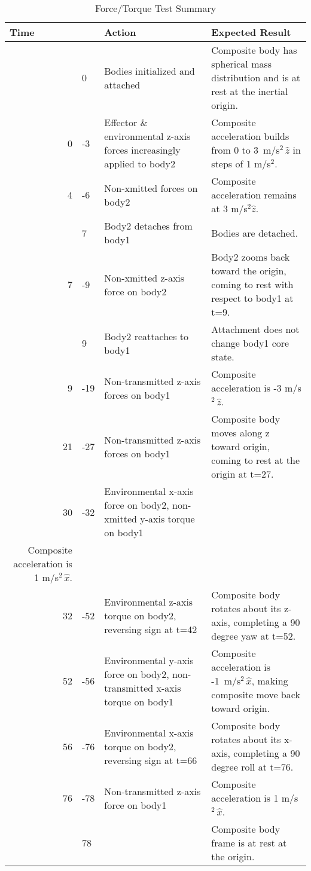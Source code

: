 \begin{table}[htp]
\centering
\caption{Force/Torque Test Summary}
\label{tab:force_torque_summary}
\vspace{1ex}
\begin{tabular}{||r@{}l|p{2.6in}|p{3in}|} \hline
\multicolumn{2}{||l|}{\bf Time} & {\bf Action} & {\bf Expected Result}
\\ \hline \hline
&0 &
  Bodies initialized and attached &
  \raggedright
  Composite body has spherical mass distribution and
  is at rest at the inertial origin.\tabularnewline[6pt]  
0&-3 &
  \raggedright
  Effector \& environmental z-axis forces increasingly applied to body2 &
  \raggedright
  Composite acceleration builds from 0 to 3~m/s$^2\,\hat z$
  in steps of 1 m/s$^2$.\tabularnewline[6pt]
4&-6 &
  Non-xmitted forces on body2 &
  Composite acceleration remains at 3 m/s$^2\hat z$.\tabularnewline[6pt]
&7 &
  Body2 detaches from body1 &
  Bodies are detached.\tabularnewline[6pt]
7&-9 &
  Non-xmitted z-axis force on body2 &
  \raggedright
  Body2 zooms back toward the origin,
  coming to rest with respect to body1 at t=9.\tabularnewline[6pt]
&9& Body2 reattaches to body1 &
  Attachment does not change body1 core state.\tabularnewline[6pt]
9&-19 &
  Non-transmitted z-axis forces on body1 &
  Composite acceleration is -3 m/s$^2\,\hat z$.\tabularnewline[6pt]
21&-27 &
  Non-transmitted z-axis forces on body1 &
  \raggedright
  Composite body moves along z toward origin,
  coming to rest at the origin at t=27.\tabularnewline[6pt]
30&-32 &
  Environmental x-axis force on body2,
  non-xmitted y-axis torque on body1 &
  \raggedright \ \\
  Composite acceleration is 1 m/s$^2\,\hat x$.\tabularnewline[6pt]
32&-52 &
  Environmental z-axis torque on body2, reversing sign at t=42 &
  \raggedright
  Composite body rotates about its z-axis,
   completing a 90 degree yaw at t=52.\tabularnewline[6pt]
52&-56 &
  Environmental y-axis force on body2,
  non-transmitted x-axis torque on body1 &
  \raggedright
  Composite acceleration is -1~m/s$^2\,\hat x$,
  making composite move back toward origin.\tabularnewline[6pt]
56&-76 &
  Environmental x-axis torque on body2, reversing sign at t=66 &
  \raggedright
  Composite body rotates about its x-axis,
   completing a 90 degree roll at t=76.\tabularnewline[6pt]
76&-78 &
  Non-transmitted z-axis force on body1 &
  Composite acceleration is 1 m/s$^2\,\hat x$.\tabularnewline[6pt]
&78 &&
  Composite body frame is at rest at the origin.\tabularnewline[6pt]
\hline
\end{tabular}
\end{table}
